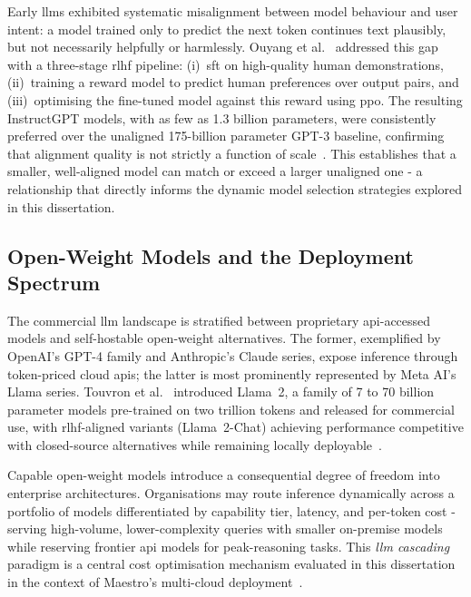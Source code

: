 Early \glspl{llm} exhibited systematic misalignment between model behaviour and user intent: a model trained only to predict the next token continues text plausibly, but not necessarily helpfully or harmlessly. Ouyang et al.~\cite{ouyang2022instructgpt} addressed this gap with a three-stage \acrfull{rlhf} pipeline: (i)~\acrfull{sft} on high-quality human demonstrations, (ii)~training a reward model to predict human preferences over output pairs, and (iii)~optimising the fine-tuned model against this reward using \acrfull{ppo}. The resulting InstructGPT models, with as few as 1.3 billion parameters, were consistently preferred over the unaligned 175-billion parameter GPT-3 baseline, confirming that alignment quality is not strictly a function of scale~\cite{ouyang2022instructgpt}. This establishes that a smaller, well-aligned model can match or exceed a larger unaligned one - a relationship that directly informs the dynamic model selection strategies explored in this dissertation.

\subsection{Open-Weight Models and the Deployment Spectrum}
\label{sec:open-weight-models}

The commercial \gls{llm} landscape is stratified between proprietary \gls{api}-accessed models and self-hostable open-weight alternatives. The former, exemplified by OpenAI's GPT-4 family and Anthropic's Claude series, expose inference through token-priced cloud \glspl{api}; the latter is most prominently represented by Meta AI's Llama series. Touvron et al.~\cite{touvron2023llama2} introduced Llama~2, a family of 7 to 70 billion parameter models pre-trained on two trillion tokens and released for commercial use, with \gls{rlhf}-aligned variants (Llama~2-Chat) achieving performance competitive with closed-source alternatives while remaining locally deployable~\cite{touvron2023llama2}.

Capable open-weight models introduce a consequential degree of freedom into enterprise architectures. Organisations may route inference dynamically across a portfolio of models differentiated by capability tier, latency, and per-token cost - serving high-volume, lower-complexity queries with smaller on-premise models while reserving frontier \gls{api} models for peak-reasoning tasks. This \textit{\gls{llm} cascading} paradigm is a central cost optimisation mechanism evaluated in this dissertation in the context of Maestro's multi-cloud deployment~\cite{touvron2023llama2,ouyang2022instructgpt}.

